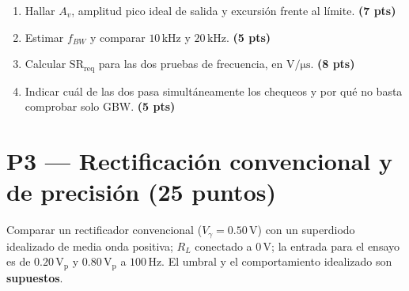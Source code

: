 \documentclass[10pt, a4paper]{article}
\begin{document}
\begin{enumerate}
    \setlength{\itemsep}{2pt}
    \item Hallar $A_v$, amplitud pico ideal de salida y excursión frente al límite. \hfill \textbf{(7 pts)}
    \item Estimar $f_{BW}$ y comparar $10\,\mathrm{kHz}$ y $20\,\mathrm{kHz}$. \hfill \textbf{(5 pts)}
    \item Calcular $\mathrm{SR}_{\mathrm{req}}$ para las dos pruebas de frecuencia, en $\mathrm{V/\mu s}$. \hfill \textbf{(8 pts)}
    \item Indicar cuál de las dos pasa simultáneamente los chequeos y por qué no basta comprobar solo GBW. \hfill \textbf{(5 pts)}
\end{enumerate}


\newpage
\section*{P3 --- Rectificación convencional y de precisión (25 puntos)}

Comparar un rectificador convencional ($V_\gamma = 0.50\,\mathrm{V}$) con un superdiodo idealizado de media onda positiva; $R_L$ conectado a $0\,\mathrm{V}$; la entrada para el ensayo es de $0.20\,\mathrm{V_p}$ y $0.80\,\mathrm{V_p}$ a $100\,\mathrm{Hz}$. El umbral y el comportamiento idealizado son \textbf{supuestos}.
\end{document}
